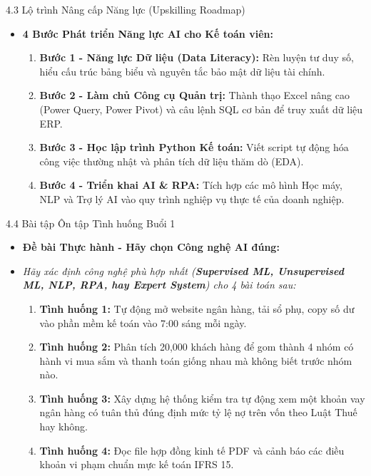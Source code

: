 \documentclass[aspectratio=169]{beamer}
\begin{document}
\begin{frame}{4.3 Lộ trình Nâng cấp Năng lực (Upskilling Roadmap)}
    \begin{itemize}
        \item \textbf{4 Bước Phát triển Năng lực AI cho Kế toán viên:}
        \begin{enumerate}
            \item \textbf{Bước 1 - Năng lực Dữ liệu (Data Literacy):} Rèn luyện tư duy số, hiểu cấu trúc bảng biểu và nguyên tắc bảo mật dữ liệu tài chính.
            \item \textbf{Bước 2 - Làm chủ Công cụ Quản trị:} Thành thạo Excel nâng cao (Power Query, Power Pivot) và câu lệnh SQL cơ bản để truy xuất dữ liệu ERP.
            \item \textbf{Bước 3 - Học lập trình Python Kế toán:} Viết script tự động hóa công việc thường nhật và phân tích dữ liệu thăm dò (EDA).
            \item \textbf{Bước 4 - Triển khai AI \& RPA:} Tích hợp các mô hình Học máy, NLP và Trợ lý AI vào quy trình nghiệp vụ thực tế của doanh nghiệp.
        \end{enumerate}
    \end{itemize}
\end{frame}

\begin{frame}{4.4 Bài tập Ôn tập Tình huống Buổi 1}
    \begin{itemize}
        \item \textbf{Đề bài Thực hành - Hãy chọn Công nghệ AI đúng:}
        \item \emph{Hãy xác định công nghệ phù hợp nhất (\textbf{Supervised ML, Unsupervised ML, NLP, RPA, hay Expert System}) cho 4 bài toán sau:}
        \begin{enumerate}
            \item \textbf{Tình huống 1:} Tự động mở website ngân hàng, tải sổ phụ, copy số dư vào phần mềm kế toán vào 7:00 sáng mỗi ngày.
            \item \textbf{Tình huống 2:} Phân tích 20,000 khách hàng để gom thành 4 nhóm có hành vi mua sắm và thanh toán giống nhau mà không biết trước nhóm nào.
            \item \textbf{Tình huống 3:} Xây dựng hệ thống kiểm tra tự động xem một khoản vay ngân hàng có tuân thủ đúng định mức tỷ lệ nợ trên vốn theo Luật Thuế hay không.
            \item \textbf{Tình huống 4:} Đọc file hợp đồng kinh tế PDF và cảnh báo các điều khoản vi phạm chuẩn mực kế toán IFRS 15.
        \end{enumerate}
    \end{itemize}
\end{frame}
\end{document}
